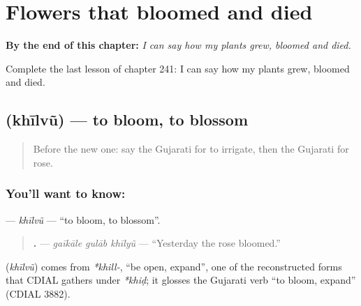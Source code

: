 
\chapter{Flowers that bloomed and died}
\label{ch:gu-flowers-that-bloomed-and-died}

\begin{chapteropening}
\textbf{By the end of this chapter:} \emph{I can say how my plants grew, bloomed and died.}

Complete the last lesson of chapter 241: I can say how my plants grew, bloomed and died.
\end{chapteropening}

\section[\texorpdfstring{\gu{ખીલવું} (khīlvũ)}{ખીલવું (khīlvũ)}]{ (khīlvũ) — to bloom, to blossom}

\label{lesson:GU-C241-khilvu}



\begin{quote}
Before the new one: say the Gujarati for to irrigate, then the Gujarati for rose.
\end{quote}

\subsection*{You'll want to know: }
\textbf{} — \emph{khīlvũ} — \textquotedblleft{}to bloom, to blossom\textquotedblright{}.

\begin{quote}
\textbf{  .} — \emph{gaīkāle gulāb khīlyũ} — \textquotedblleft{}Yesterday the rose bloomed.\textquotedblright{}
\end{quote}

\begin{cousinweb}
\textbf{} (\emph{khīlvũ}) comes from \emph{*khill-}, \textquotedblleft{}be open, expand\textquotedblright{}, one of the reconstructed forms that CDIAL gathers under \emph{*khiḍ}; it glosses the Gujarati verb \textquotedblleft{}to bloom, expand\textquotedblright{} (CDIAL 3882).
\end{cousinweb}

